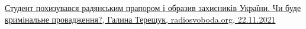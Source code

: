  
 
 
 
 

\href{https://www.radiosvoboda.org/a/komunizm-totalitarnyy-rezhym-symvoilka/31573870.html}{%
Студент похизувався радянським прапором і образив захисників України. Чи буде кримінальне провадження?, %
Галина Терещук, radiosvoboda.org, 22.11.2021%
}
